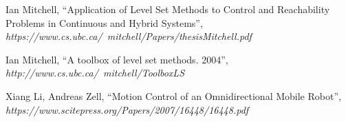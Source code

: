 \begin{thebibliography}{1}
Ian Mitchell, ``Application of Level Set Methods to Control and Reachability Problems in Continuous and Hybrid Systems'',
\emph{https://www.cs.ubc.ca/~mitchell/Papers/thesisMitchell.pdf}

Ian Mitchell, ``A toolbox of level set methods. 2004'',
\emph{http://www.cs.ubc.ca/~mitchell/ToolboxLS}

Xiang Li, Andreas Zell, ``Motion Control of an Omnidirectional Mobile Robot'',
\emph{https://www.scitepress.org/Papers/2007/16448/16448.pdf}

\end{thebibliography}

